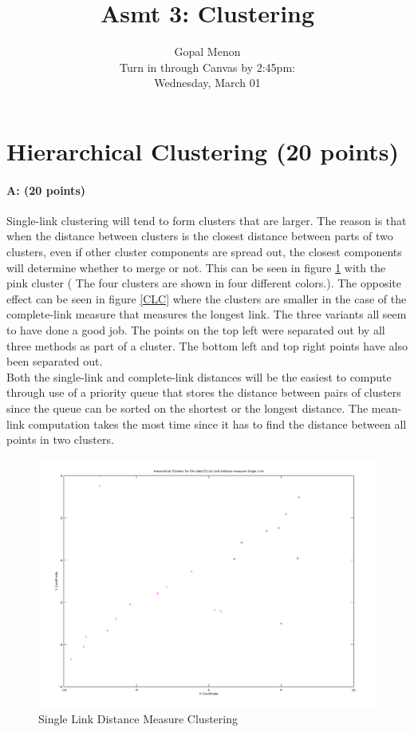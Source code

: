 \documentclass[11pt]{article}
\title{Asmt 3: Clustering}
\author{Gopal Menon\\Turn in through Canvas by 2:45pm: \\
Wednesday, March 01}
\date{}
\begin{document}
\maketitle



\section{Hierarchical Clustering (20 points)}

\paragraph{A: (20 points)} 

Single-link clustering will tend to form clusters that are larger. The reason is that when the distance between clusters is the closest distance between parts of two clusters, even if other cluster components are spread out, the closest components will determine whether to merge or not. This can be seen in figure \ref{SLC} with the pink cluster ( The four clusters are shown in four different colors.). The opposite effect can be seen in figure \ref{CLC} where the clusters are smaller in the case of the complete-link measure that measures the longest link. The three variants all seem to have done a good job. The points on the top left were separated out by all three methods as part of a cluster. The bottom left and top right points have also been separated out.\\

Both the single-link and complete-link distances will be the easiest to compute through use of a priority queue that stores the distance between pairs of clusters since the queue can be sorted on the shortest or the longest distance. The mean-link computation takes the most time since it has to find the distance between all points in two clusters.

\begin{figure}[!htb]
\centering
\includegraphics[width=5in]{figures/1ASingleLink.png}
\caption{Single Link Distance Measure Clustering}
\label{SLC}
\end{figure}
 
\end{document}
